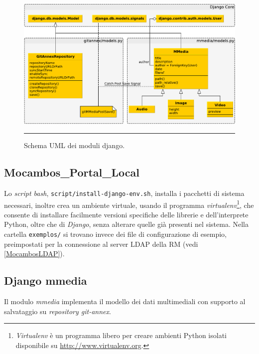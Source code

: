 \begin{figure}[htbp]
  \centering
  \includegraphics[width=\textwidth]{./Figure/UML_Schema_Django-crop.pdf}
  \rule{35em}{0.5pt}
  \caption[Schema UML dei moduli django]{Schema UML dei moduli django.}
  \label{fig:SchemaUMLDjango}
\end{figure}

\subsection{Mocambos\_Portal\_Local}

Lo \emph{script bash}, \verb|script/install-django-env.sh|, installa i
pacchetti di sistema necessari, inoltre crea un ambiente virtuale,
usando il programma \emph{virtualenv}\footnote{\emph{Virtualenv} è un
  programma libero per creare ambienti Python isolati disponibile su
  \url{http://www.virtualenv.org}.}, che consente di installare
facilmente versioni specifiche delle librerie e dell'interprete
Python, oltre che di \emph{Django}, senza alterare quelle già presenti
nel sistema. Nella cartella \verb|exemplos/| si trovano invece dei
file di configurazione di esempio, preimpostati per la connessione al
server LDAP della RM (vedi \ref{MocambosLDAP}).


\subsection{Django mmedia}

Il modulo \emph{mmedia} implementa il modello dei dati
multimediali con supporto al salvataggio su \emph{repository
  git-annex}.

